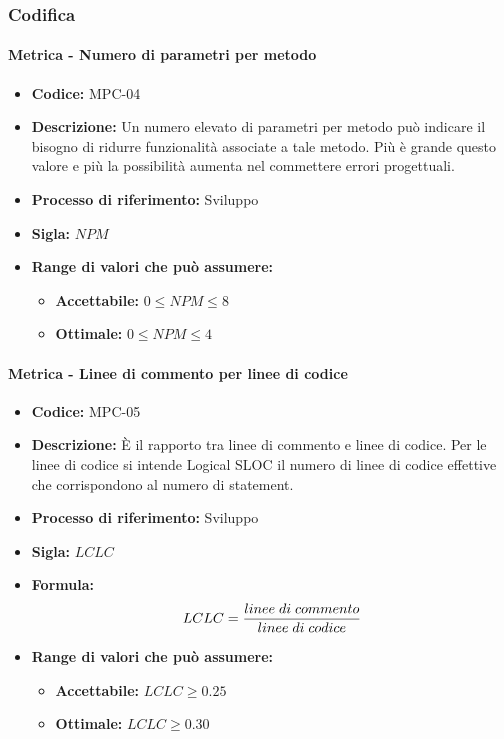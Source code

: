 \subsubsection{Codifica}  
    \paragraph{Metrica - Numero di parametri per metodo} 
    \begin{itemize}
        \item \textbf{Codice:} MPC-04
        \item \textbf{Descrizione:} Un numero elevato di parametri per metodo può indicare il bisogno di ridurre funzionalità associate a tale metodo. Più è grande questo valore e più la possibilità aumenta nel commettere errori progettuali.
        \item \textbf{Processo di riferimento:} Sviluppo
        \item \textbf{Sigla:} $NPM$
        \item \textbf{Range di valori che può assumere:}
        \begin{itemize}
            \item \textbf{Accettabile:} $0 \leq{} NPM \leq 8$
            \item \textbf{Ottimale:} $0 \leq{} NPM \leq 4$
        \end{itemize}
    \end{itemize}

    \paragraph{Metrica - Linee di commento per linee di codice}
    \begin{itemize}
        \item \textbf{Codice:} MPC-05
        \item \textbf{Descrizione:} È il rapporto tra linee di commento e linee di codice. Per le linee di codice si intende Logical SLOC il numero di linee di codice effettive che corrispondono al numero di statement.
        \item \textbf{Processo di riferimento:} Sviluppo
        \item \textbf{Sigla:} $LCLC$
        \item \textbf{Formula:}$$LCLC = {linee \; di \; commento\over linee \; di \; codice}$$
        \item \textbf{Range di valori che può assumere:}
        \begin{itemize}
            \item \textbf{Accettabile:} $LCLC \geq 0.25$
            \item \textbf{Ottimale:} $LCLC \geq 0.30$
        \end{itemize}
    \end{itemize}

